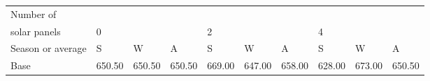 \begin{table}[h] 
\centering 
\begin{tabular}{l|lll|lll|lll}Number of \\ solar panels&0& & &2& & &4& & \\ \hline 
Season or average & S & W & A & S & W & A & S & W & A \\ \hline 
Base&650.50&650.50&650.50&669.00&647.00&658.00&628.00&673.00&650.50 \\ 
\end{tabular} 
\end{table}